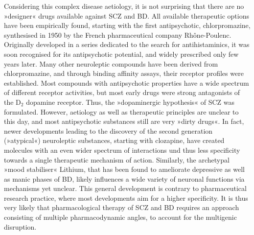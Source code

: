 Considering this complex disease aetiology, it is not surprising that there are no »designer« drugs available against SCZ and BD. All available therapeutic options have been empirically found, starting with the first antipsychotic, chlorpromazine, synthesised in 1950 by the French pharmaceutical company Rhône-Poulenc. Originally developed in a series dedicated to the search for antihistaminics, it was soon recognised for its antipsychotic potential, and widely prescribed only few years later. Many other neuroleptic compounds have been derived from chlorpromazine, and through binding affinity assays, their receptor profiles were established. Most compounds with antipsychotic properties have a wide spectrum of different receptor activities, but most early drugs were strong antagonists of the D$_2$ dopamine receptor. Thus, the »dopaminergic hypothesis« of SCZ was formulated. However, aetiology as well as therapeutic principles are unclear to this day, and most antipsychotic substances still are very »dirty drugs«. In fact, newer developments leading to the discovery of the second generation (»atypical«) neuroleptic substances, starting with clozapine, have created molecules with an even wider spectrum of interactions und thus less specificity towards a single therapeutic mechanism of action. Similarly, the archetypal »mood stabiliser« Lithium, that has been found to ameliorate depressive as well as manic phases of BD, likely influences a wide variety of neuronal functions via mechanisms yet unclear.\cite{Malhi2013} This general development is contrary to pharmaceutical research practice, where most developments aim for a higher specificity. It is thus very likely that pharmacological therapy of SCZ and BD requires an approach consisting of multiple pharmacodynamic angles, to account for the multigenic disruption.

